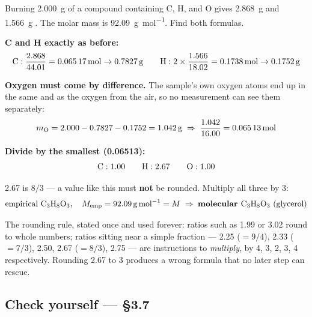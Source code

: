 \documentclass{apchem-worksheet}
\begin{document}
\begin{workedexample}
Burning \SI{2.000}{\gram} of a compound containing C, H, and O gives
\SI{2.868}{\gram}  and \SI{1.566}{\gram} . The molar mass
is \SI{92.09}{\gram\per\mole}. Find both formulas.

\textbf{C and H exactly as before:}
\[ \ce{C}: \frac{2.868}{44.01} = \SI{0.06517}{\mole}
   \to \SI{0.7827}{\gram} \qquad
   \ce{H}: 2 \times \frac{1.566}{18.02} = \SI{0.1738}{\mole}
   \to \SI{0.1752}{\gram} \]

\textbf{Oxygen must come by difference.} The sample's own oxygen atoms end
up in the same  and  as the oxygen from the air, so no
measurement can see them separately:
\[ m_{\ce{O}} = 2.000 - 0.7827 - 0.1752 = \SI{1.042}{\gram}
   \;\Rightarrow\; \frac{1.042}{16.00} = \SI{0.06513}{\mole} \]

\textbf{Divide by the smallest (0.06513):}
\[ \ce{C}: 1.00 \qquad \ce{H}: 2.67 \qquad \ce{O}: 1.00 \]

2.67 is $8/3$ --- a value like this must \textbf{not} be rounded. Multiply
all three by 3:
\[ \text{empirical } \ce{C3H8O3}, \quad M_{\text{emp}} = \SI{92.09}{\gram\per\mole}
   = M \;\Rightarrow\; \textbf{molecular } \ce{C3H8O3}~\text{(glycerol)} \]
\end{workedexample}

\begin{apctrap}
The rounding rule, stated once and used forever: ratios such as 1.99 or
3.02 round to whole numbers; ratios sitting near a simple fraction ---
2.25 ($=9/4$), 2.33 ($=7/3$), 2.50, 2.67 ($=8/3$), 2.75 --- are
instructions to \emph{multiply}, by 4, 3, 2, 3, 4 respectively. Rounding
2.67 to 3 produces a wrong formula that no later step can rescue.
\end{apctrap}

\subsection*{\sffamily Check yourself --- \S3.7}
\end{document}
